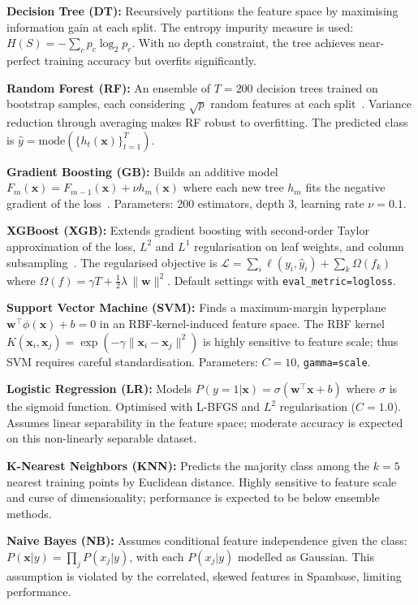 \documentclass[conference]{IEEEtran}
\begin{document}
\textbf{Decision Tree (DT):} Recursively partitions the feature space by maximising information gain at each split. The entropy impurity measure is used: $H(S) = -\sum_{c} p_c \log_2 p_c$. With no depth constraint, the tree achieves near-perfect training accuracy but overfits significantly.

\textbf{Random Forest (RF):} An ensemble of $T=200$ decision trees trained on bootstrap samples, each considering $\sqrt{p}$ random features at each split~\cite{ref6}. Variance reduction through averaging makes RF robust to overfitting. The predicted class is $\hat{y} = \text{mode}(\{h_t(\mathbf{x})\}_{t=1}^T)$.

\textbf{Gradient Boosting (GB):} Builds an additive model $F_m(\mathbf{x}) = F_{m-1}(\mathbf{x}) + \nu h_m(\mathbf{x})$ where each new tree $h_m$ fits the negative gradient of the loss~\cite{ref10}. Parameters: 200 estimators, depth 3, learning rate $\nu=0.1$.

\textbf{XGBoost (XGB):} Extends gradient boosting with second-order Taylor approximation of the loss, $L^2$ and $L^1$ regularisation on leaf weights, and column subsampling~\cite{ref7}. The regularised objective is $\mathcal{L} = \sum_i \ell(y_i, \hat{y}_i) + \sum_k \Omega(f_k)$ where $\Omega(f) = \gamma T + \frac{1}{2}\lambda\,\|\mathbf{w}\|^2$. Default settings with \texttt{eval\_metric=logloss}.

\textbf{Support Vector Machine (SVM):} Finds a maximum-margin hyperplane $\mathbf{w}^\top \phi(\mathbf{x}) + b = 0$ in an RBF-kernel-induced feature space. The RBF kernel $K(\mathbf{x}_i, \mathbf{x}_j) = \exp(-\gamma \|\mathbf{x}_i - \mathbf{x}_j\|^2)$ is highly sensitive to feature scale; thus SVM requires careful standardisation. Parameters: $C=10$, \texttt{gamma=scale}.

\textbf{Logistic Regression (LR):} Models $P(y=1|\mathbf{x}) = \sigma(\mathbf{w}^\top \mathbf{x} + b)$ where $\sigma$ is the sigmoid function. Optimised with L-BFGS and $L^2$ regularisation ($C=1.0$). Assumes linear separability in the feature space; moderate accuracy is expected on this non-linearly separable dataset.

\textbf{K-Nearest Neighbors (KNN):} Predicts the majority class among the $k=5$ nearest training points by Euclidean distance. Highly sensitive to feature scale and curse of dimensionality; performance is expected to be below ensemble methods.

\textbf{Naive Bayes (NB):} Assumes conditional feature independence given the class: $P(\mathbf{x}|y) = \prod_j P(x_j|y)$, with each $P(x_j|y)$ modelled as Gaussian. This assumption is violated by the correlated, skewed features in Spambase, limiting performance.
\end{document}
